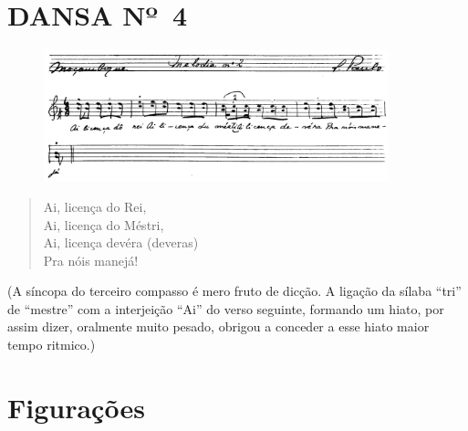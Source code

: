\section{DANSA Nº~4}

\begin{figure}[!ht]
\centering
 \includegraphics[width=100mm]{./imgs/img6.png}
\end{figure}

\begin{verse}
Ai, licença do Rei,\\
Ai, licença do Méstri,\\
Ai, licença devéra (deveras)\\
Pra nóis manejá!
\end{verse}
(A síncopa do terceiro compasso é mero fruto de dicção. A ligação da
sílaba ``tri'' de ``mestre'' com a interjeição ``Ai'' do verso seguinte,
formando um hiato, por assim dizer, oralmente muito pesado, obrigou a
conceder a esse hiato maior tempo ritmico.)

\section{Figurações}

